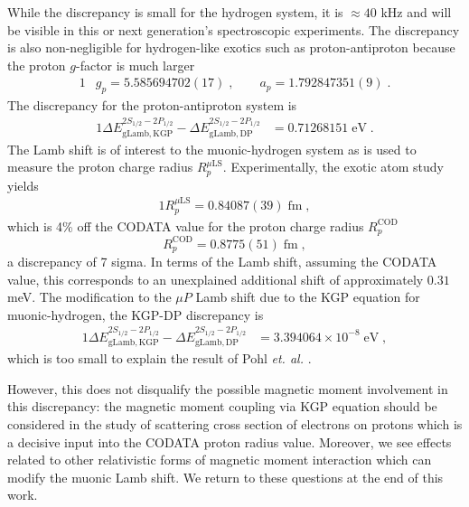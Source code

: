 \documentclass[epj]{svjour}
\begin{document}
While the discrepancy is small for the hydrogen system, it is $\approx 40$ kHz and will be visible in this or next generation\rq s spectroscopic experiments. The discrepancy is also non-negligible for hydrogen-like exotics such as proton-antiproton because the proton $g$-factor is much larger
\begin{alignat}{1}\label{gpaFULL}
&g_p=5.585694702(17)\;,\qquad a_p=1.792847351(9)\;. 
\end{alignat} 
The discrepancy for the proton-antiproton system is
\begin{alignat}{1}
\label{lamb06} \Delta E_{\mathrm{gLamb,KGP}}^{2S_{1/2}-2P_{1/2}}-\Delta E_{\mathrm{gLamb,DP}}^{2S_{1/2}-2P_{1/2}}&=0.71268151\;\mathrm{eV}\;.
\end{alignat} 
The Lamb shift is of interest to the muonic-hydrogen system as is used to measure the proton charge radius $R_p^{\mu\mathrm{LS}}$. Experimentally, the exotic atom study yields~\cite{Pohl:2013yb}
\begin{alignat}{1}\label{protonR}
R_p^{\mu\mathrm{LS}}=0.84087(39)\;\mathrm{fm}\;,
\end{alignat} 
which is 4\% off the CODATA value for the proton charge radius $R_p^\mathrm{COD}$
\begin{equation}
R_p^\mathrm{COD}=0.8775(51)\;\mathrm{fm}\;,
\end{equation}
a discrepancy of 7 sigma. In terms of the Lamb shift, assuming the CODATA value, this corresponds to an unexplained additional shift of approximately $0.31$\;meV. The modification to the $\mu P$ Lamb shift due to the KGP equation for muonic-hydrogen, the KGP-DP discrepancy is
\begin{alignat}{1}
\label{lamb07} \Delta E_{\mathrm{gLamb,KGP}}^{2S_{1/2}-2P_{1/2}}-\Delta E_{\mathrm{gLamb,DP}}^{2S_{1/2}-2P_{1/2}}&=\!3.394064\times10^{-8}\;\mathrm{eV}\;,
\end{alignat} 
which is too small to explain the result of Pohl \emph{et. al.} \cite{Pohl:2013yb}.

However, this does not disqualify the possible magnetic moment involvement in this discrepancy: the magnetic moment coupling via KGP equation should be considered in the study of scattering cross section of electrons on protons which is a decisive input into the CODATA proton radius value. Moreover, we see effects related to other relativistic forms of magnetic moment interaction which can modify the muonic Lamb shift. We return to these questions at the end of this work.

\end{document}

